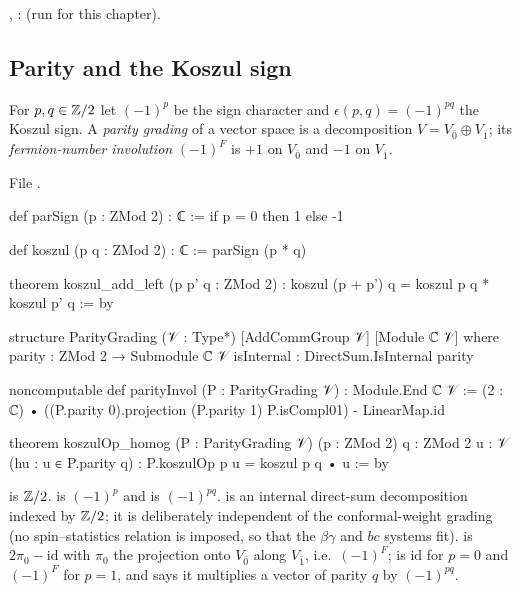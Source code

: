 \begin{status}
\allowbreak{}\allowbreak{}, \allowbreak{}\allowbreak{}\allowbreak{}:
 (run for this chapter).
\end{status}

\subsection{Parity and the Koszul sign}

\begin{definition}\label{l02:def:parity}
For $p,q\in{\mathbb{Z}}/2$ let $(-1)^p$ be the sign character and $\epsilon(p,q) = (-1)^{pq}$ the Koszul sign. A
\emph{parity grading} of a vector space is a decomposition $V = V_{\bar0}\oplus V_{\bar1}$; its
\emph{fermion-number involution} $(-1)^F$ is $+1$ on $V_{\bar0}$ and $-1$ on $V_{\bar1}$.
\end{definition}

File .
\begin{leancode}
def parSign (p : ZMod 2) : ℂ := if p = 0 then 1 else -1

def koszul (p q : ZMod 2) : ℂ := parSign (p * q)

theorem koszul_add_left (p p' q : ZMod 2) :
    koszul (p + p') q = koszul p q * koszul p' q := by

structure ParityGrading (𝒱 : Type*) [AddCommGroup 𝒱] [Module ℂ 𝒱] where
  parity : ZMod 2 → Submodule ℂ 𝒱
  isInternal : DirectSum.IsInternal parity

noncomputable def parityInvol (P : ParityGrading 𝒱) : Module.End ℂ 𝒱 :=
  (2 : ℂ) • ((P.parity 0).projection (P.parity 1) P.isCompl01) - LinearMap.id

theorem koszulOp_homog (P : ParityGrading 𝒱) (p : ZMod 2) {q : ZMod 2} {u : 𝒱}
    (hu : u ∈ P.parity q) : P.koszulOp p u = koszul p q • u := by
\end{leancode}

\begin{dictionary}
 is ${\mathbb{Z}}/2$.  is $(-1)^p$ and  is $(-1)^{pq}$.
 is an internal direct-sum decomposition indexed by ${\mathbb{Z}}/2$; it is deliberately
independent of the conformal-weight grading (no spin--statistics relation is imposed, so that the
$\beta\gamma$ and $bc$ systems fit).  is $2\pi_0 - \mathrm{id}$ with $\pi_0$ the projection onto
$V_{\bar0}$ along $V_{\bar1}$, i.e.\ $(-1)^F$;  is $\mathrm{id}$ for $p = 0$ and $(-1)^F$ for
$p=1$, and  says it multiplies a vector of parity $q$ by $(-1)^{pq}$.
\end{dictionary}

